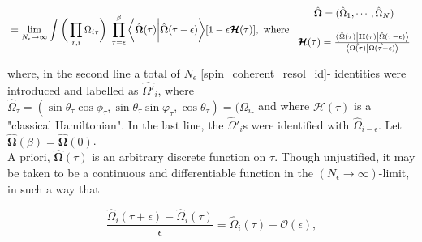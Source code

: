 \documentclass{homework}
\begin{document}
\begin{equation}
\begin{split}
    &= \lim_{N_{\epsilon} \rightarrow \infty} \int \bigg( \prod_{r, i} {{\Omega}}_{i \tau} \bigg) \textnormal{ } \prod_{\tau = \epsilon}^{\beta} \bigg\langle \hat{\bm{\Omega}}(\tau) \bigg| \hat{\bm{\Omega}}(\tau - \epsilon) \bigg\rangle [1 - \epsilon \bm{\mathcal{H}}(\tau)], \textnormal{ where } \begin{array}{cc}
         \hat{\bm{\Omega}} = (\hat{{\Omega}}_1, \cdots, \hat{{\Omega}}_N)  \\
         \\
         \bm{\mathcal{H}}(\tau) = \frac{\bra{\hat{\Omega}(\tau)} {{\bf H}}(\tau) \ket{\hat{\Omega}(\tau - \epsilon)}}{\bra{\hat{\Omega(\tau)}} \ket{\hat{\Omega(\tau - \epsilon)}}}
    \end{array} \\
    \label{generating_function_and_cl_hammiltonian}
\end{split}
\end{equation}

where, in the second line a total of $N_{\epsilon}$ \cref{spin_coherent_resol_id}-
identities were introduced and labelled as 
$\hat{\Omega'}_i$, where $\hat{\Omega}_\tau 
= (\sin \theta_\tau \cos \phi_\tau, \sin 
\theta_\tau \sin \varphi_\tau, \cos 
\theta_\tau) = (\Omega_i_\tau$ and where 
$\bm{\mathcal{H}}(\tau)$ is a "classical 
Hamiltonian". In the last line, the 
$\hat{\Omega'}_{i}$s were identified with 
$\hat{\Omega}_{i-\epsilon}$. Let 
$\hat{\bm{\Omega}}(\beta) = 
\hat{\bm{\Omega}}(0)$. \\

A priori, $\hat{\bm{\Omega}}(\tau)$ is an arbitrary discrete function on $\tau$. Though unjustified, it may be taken to be a continuous and differentiable function in the $(N_{\epsilon}\rightarrow\infty)$-limit, in such a way that 

\begin{equation}
    \frac{\hat{{\Omega}}_i(\tau + \epsilon) - \hat{{\Omega}}_i(\tau)}{\epsilon} = \hat{{\Omega}}_i(\tau) + \mathcal{O}(\epsilon),
\end{equation}
\end{document}
